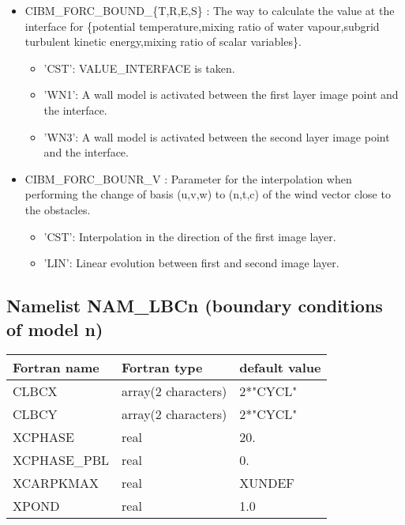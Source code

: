 \begin{itemize}
\item CIBM\_FORC\_BOUND\_\{T,R,E,S\} :
The way to calculate the value at the interface for \{potential
temperature,mixing ratio of water vapour,subgrid turbulent kinetic energy,mixing ratio of
scalar variables\}.
\begin{itemize}
\item 'CST': VALUE\_INTERFACE is taken.
\item 'WN1': A wall model is activated between the first layer image point and the interface.
\item 'WN3': A wall model is activated between the second layer image point and the interface.
\end{itemize}

\item CIBM\_FORC\_BOUNR\_V :
Parameter for the interpolation when performing the change of basis (u,v,w) to (n,t,c) of the wind
vector close to the obstacles.
\begin{itemize}
\item 'CST': Interpolation in the direction of the first image layer.
\item 'LIN': Linear evolution between first and second image layer.
\end{itemize}

\end{itemize}

\subsection{Namelist NAM\_LBCn (boundary conditions of model n)}

\begin{center}
\begin{tabular} {|l|l|l|}
\hline
Fortran name & Fortran type & default value \\
\hline
CLBCX        &  array(2 characters) & 2*"CYCL" \\
CLBCY        &  array(2 characters) & 2*"CYCL" \\
XCPHASE      & real                 &  20.     \\
XCPHASE\_PBL & real                 &  0.      \\
XCARPKMAX    & real                 &  XUNDEF  \\
XPOND        & real                 &  1.0  \\
\hline
\end{tabular}
\end{center}

